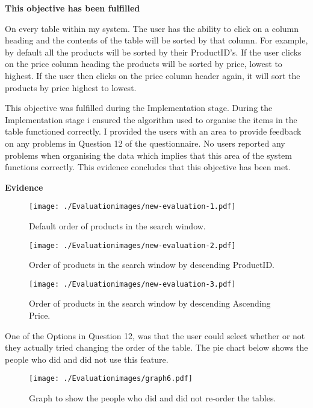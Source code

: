 \textbf{\large{This objective has been fulfilled}}

On every table within my system. The user has the ability to click on a column heading and the contents of the table will be sorted by that column. For example, by default all the products will be sorted by their ProductID's. If the user clicks on the price column heading the products will be sorted by price, lowest to highest. If the user then clicks on the price column header again, it will sort the products by price highest to lowest.

This objective was fulfilled during the Implementation stage. During the Implementation stage i ensured the algorithm used to organise the items in the table functioned correctly. I provided the users with an area to provide feedback on any problems in Question 12 of the questionnaire. No users reported any problems when organising the data which implies that this area of the system functions correctly. This evidence concludes that this objective has been met.

\textbf{Evidence} \newline

\begin{figure}[H]
\caption{Default order of products in the search window.} \label{new-evaluation-1}
\hfill\texttt{[image: ./Evaluationimages/new-evaluation-1.pdf]}
\end{figure}

\begin{figure}[H]
\caption{Order of products in the search window by descending ProductID.} \label{new-evaluation-2}
\hfill\texttt{[image: ./Evaluationimages/new-evaluation-2.pdf]}
\end{figure}

\begin{figure}[H]
\caption{Order of products in the search window by descending Ascending Price.} \label{new-evaluation-3}
\hfill\texttt{[image: ./Evaluationimages/new-evaluation-3.pdf]}
\end{figure}

One of the Options in Question 12, was that the user could select whether or not they actually tried changing the order of the table. The pie chart below shows the people who did and did not use this feature.

\begin{figure}[H]
\caption{Graph to show the people who did and did not re-order the tables.} \label{graph6}
\hfill\texttt{[image: ./Evaluationimages/graph6.pdf]}
\end{figure}

